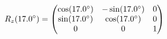 \documentclass[preview]{standalone}
\begin{document}
\begin{align*}
\special{dvisvgm:raw <g id='unique000'>}R_z(17.0^\circ) = \begin{pmatrix} \cos(17.0^\circ) & -\sin(17.0^\circ) & 0 \\ \sin(17.0^\circ) & \cos(17.0^\circ) & 0 \\ 0 & 0 & 1 \end{pmatrix}\special{dvisvgm:raw </g>}
\end{align*}
\end{document}
